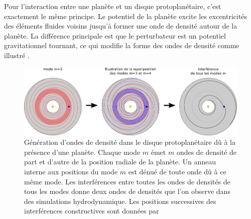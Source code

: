 \bigskip

Pour l'interaction entre une planète et un disque protoplanétaire, c'est exactement le même principe. Le potentiel de la planète excite les excentricités des éléments fluides voisins jusqu'à former une onde de densité autour de la planète. La différence principale est que le perturbateur est un potentiel gravitationnel tournant, ce qui modifie la forme des ondes de densité comme illustré . 

\begin{figure}[htbp]
\centering
\includegraphics[width=\linewidth]{figure/lindblad_torque.pdf}
\caption{Génération d'ondes de densité dans le disque protoplanétaire dû à la présence d'une planète. Chaque mode $m$ émet $m$ ondes de densité de part et d'autre de la position radiale de la planète. Un anneau interne  aux positions du mode $m$ est dénué de toute onde dû à ce même mode. Les interférences entre toutes les ondes de densités de tous les modes donne deux ondes de densités que l'on observe dans des simulations hydrodynamique. Les positions successives des interférences constructives sont données par \cite[eq. (13) et (24)]{ogilvie2002wake}}\label{fig:lindblad_torque}
\end{figure}




